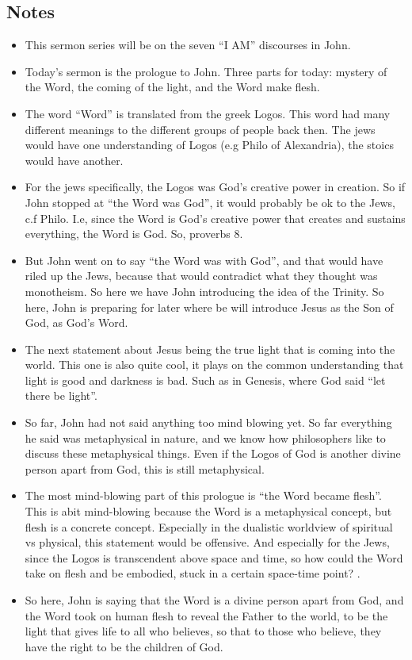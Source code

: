 \subsection*{Notes}
\begin{itemize}
  \item{This sermon series will be on the seven “I AM” discourses in John.}
  \item{Today’s sermon is the prologue to John. Three parts for today: mystery of the Word, the coming of the light, and the Word make flesh.}
  \item{The word “Word” is translated from the greek Logos. This word had many different meanings to the different groups of people back then. The jews would have one understanding of Logos (e.g Philo of Alexandria), the stoics would have another.}
  \item{For the jews specifically, the Logos was God’s creative power in creation. So if John stopped at “the Word was God”, it would probably be ok to the Jews, c.f Philo. I.e, since the Word is God’s creative power that creates and sustains everything, the Word is God. So, proverbs 8.}
  \item{But John went on to say “the Word was with God”, and that would have riled up the Jews, because that would contradict what they thought was monotheism. So here we have John introducing the idea of the Trinity. So here, John is preparing for later where be will introduce Jesus as the Son of God, as God’s Word. }
  \item{The next statement about Jesus being the true light that is coming into the world. This one is also quite cool, it plays on the common understanding that light is good and darkness is bad. Such as in Genesis, where God said “let there be light”.}
  \item{So far, John had not said anything too mind blowing yet. So far everything he said was metaphysical in nature, and we know how philosophers like to discuss these metaphysical things. Even if the Logos of God is another divine person apart from God, this is still metaphysical.}
  \item{The most mind-blowing part of this prologue is “the Word became flesh”. This is abit mind-blowing because the Word is a metaphysical concept, but flesh is a concrete concept. Especially in the dualistic worldview of spiritual vs physical, this statement would be offensive. And especially for the Jews, since the Logos is transcendent above space and time, so how could the Word take on flesh and be embodied, stuck in a certain space-time point? .}
  \item{So here, John is saying that the Word is a divine person apart from God, and the Word took on human flesh to reveal the Father to the world, to be the light that gives life to all who believes, so that to those who believe, they have the right to be the children of God. }
\end{itemize}